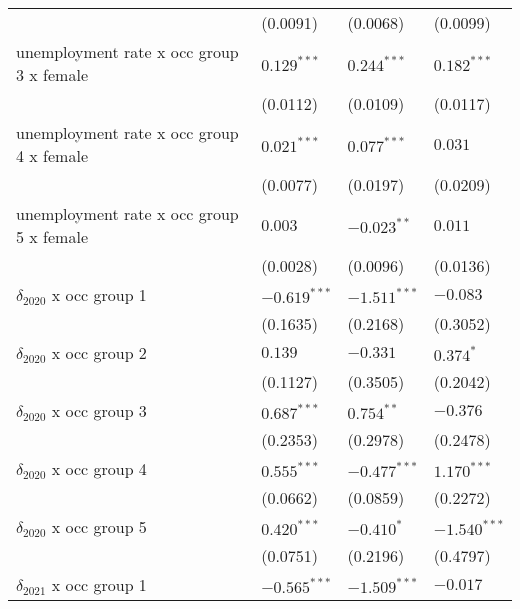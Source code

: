 \begin{tabular}{llll}
                                         &           (0.0091) &           (0.0068) &           (0.0099) \\
unemployment rate x occ group 3 x female &      $0.129^{***}$ &      $0.244^{***}$ &      $0.182^{***}$ \\
                                         &           (0.0112) &           (0.0109) &           (0.0117) \\
unemployment rate x occ group 4 x female &      $0.021^{***}$ &      $0.077^{***}$ &            $0.031$ \\
                                         &           (0.0077) &           (0.0197) &           (0.0209) \\
unemployment rate x occ group 5 x female &            $0.003$ &      $-0.023^{**}$ &            $0.011$ \\
                                         &           (0.0028) &           (0.0096) &           (0.0136) \\
$\delta_{2020}$ x occ group 1            &     $-0.619^{***}$ &     $-1.511^{***}$ &           $-0.083$ \\
                                         &           (0.1635) &           (0.2168) &           (0.3052) \\
$\delta_{2020}$ x occ group 2            &            $0.139$ &           $-0.331$ &          $0.374^*$ \\
                                         &           (0.1127) &           (0.3505) &           (0.2042) \\
$\delta_{2020}$ x occ group 3            &      $0.687^{***}$ &       $0.754^{**}$ &           $-0.376$ \\
                                         &           (0.2353) &           (0.2978) &           (0.2478) \\
$\delta_{2020}$ x occ group 4            &      $0.555^{***}$ &     $-0.477^{***}$ &      $1.170^{***}$ \\
                                         &           (0.0662) &           (0.0859) &           (0.2272) \\
$\delta_{2020}$ x occ group 5            &      $0.420^{***}$ &         $-0.410^*$ &     $-1.540^{***}$ \\
                                         &           (0.0751) &           (0.2196) &           (0.4797) \\
$\delta_{2021}$ x occ group 1            &     $-0.565^{***}$ &     $-1.509^{***}$ &           $-0.017$ \\

\end{tabular}
